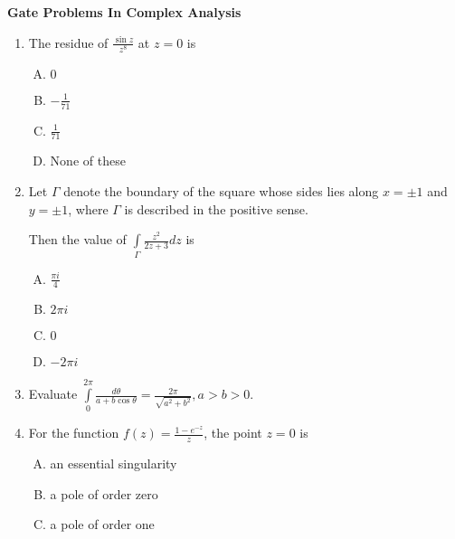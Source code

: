 \documentclass[12pt,a4paper]{article}
\begin{document}
\centering\textbf{Gate Problems In Complex Analysis}


\begin{enumerate}

\item The residue of $\frac{\sin z}{z^8}$ at $z=0$ is

\begin{enumerate}[(A)]

\item $
0
$

\item $
-\frac{1}{71}$

\item $
\frac{1}{71}
$

\item 
None of these



\end{enumerate}


\item Let $\Gamma$ denote the boundary of the square whose sides lies along $ x= \pm 1$ and $y= \pm 1$, where $\Gamma$ is described in the positive sense.

Then the value of $ \int\limits_{\Gamma}\frac{z^2}{2z + 3} dz$ is

\begin{enumerate}[(A)]

\item $
\frac{\pi i}{4}
$

\item $
2 \pi i
$

\item $
0$

\item $
-2 \pi i
$

\end{enumerate}

\item Evaluate $\int\limits_{0}^{2 \pi} \frac{d \theta}{a+b \cos \theta} = \frac{2 \pi}{\sqrt{a^2+b^2}}, a>b>0. $

\item For the function $f(z)=\frac{1-e^{-z}}{z}$, the point $z=0$ is


\begin{enumerate}[(A)]

\item 
an essential singularity

\item 
a pole of order zero

\item 
a pole of order one


\end{enumerate}
\end{enumerate}
\end{document}
